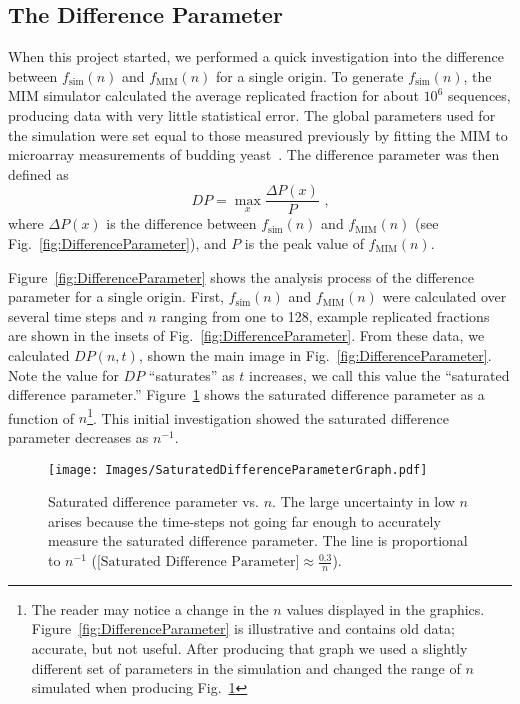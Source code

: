 	
		\subsection{The Difference Parameter}
		\label{subsec:earlywork}
		
		When this project started, we performed a quick investigation into the difference between $f_\text{sim}(n)$ and $f_\text{MIM}(n)$ for a single origin.
		To generate $f_\text{sim}(n)$, the MIM simulator calculated the average replicated fraction for about $10^6$ sequences, producing data with very little statistical error.
		The global parameters used for the simulation were set equal to those measured previously by fitting the MIM to microarray measurements of budding yeast~\cite{ScottsPaper}.
		The difference parameter was then defined as
		\begin{equation} \label{DifferenceParameter}
			DP = \max_{x} {\frac {\Delta P(x)} {P}} \text{ ,}
		\end{equation}
		where $\Delta P(x)$ is the difference between $f_\text{sim}(n)$ and $f_\text{MIM}(n)$ (see Fig.~\ref{fig:DifferenceParameter}), and $P$ is the peak value of $f_\text{MIM}(n)$.
		
		Figure~\ref{fig:DifferenceParameter} shows the analysis process of the difference parameter for a single origin.
		First, $f_\text{sim}(n)$ and $f_\text{MIM}(n)$ were calculated over several time steps and $n$ ranging from one to 128, example replicated fractions are shown in the insets of Fig.~\ref{fig:DifferenceParameter}.
		From these data, we calculated $DP(n,t)$, shown the main image in Fig.~\ref{fig:DifferenceParameter}.
		Note the value for $DP$ ``saturates'' as $t$ increases, we call this value the ``saturated difference parameter.''
		Figure~\ref{fig:SaturatedDifferenceParameter} shows the saturated difference parameter as a function of $n$\footnote{
		The reader may notice a change in the $n$ values displayed in the graphics. Figure~\ref{fig:DifferenceParameter} is illustrative and contains old data; accurate, but not useful.
		After producing that graph we used a slightly different set of parameters in the simulation and changed the range of $n$ simulated when producing Fig.~\ref{fig:SaturatedDifferenceParameter}}.
		This initial investigation showed the saturated difference parameter decreases as $n^{-1}$.
		
		\begin{figure}[tbh]
			\begin{center}
				\texttt{[image: Images/SaturatedDifferenceParameterGraph.pdf]}
			\end{center}
				\caption[Saturated Difference Parameter]{\label{fig:SaturatedDifferenceParameter} Saturated difference parameter vs. $n$.
				The large uncertainty in low $n$ arises because the time-steps not going far enough to accurately measure the saturated difference parameter.
				The line is proportional to $n^{-1}$ ($\text{[Saturated Difference Parameter]} \approx \frac{0.3}{n}$).
				}
		\end{figure}
		
